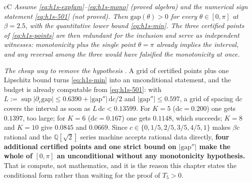 \begin{claimbox}{cC}
\emph{Assume \eqref{eq:h1s-expfam}--\eqref{eq:h1s-mono} (proved algebra) and the numerical sign
statement \eqref{eq:h1s-501} (not proved). Then $\mathrm{gap}(\theta)>0$ for every
$\theta\in[0,\pi]$ at $\beta=2.5$, with the quantitative lower bound \eqref{eq:h1s-min}. The three
certified points of \eqref{eq:h1s-points} are then \emph{redundant for the inclusion} and serve as
independent witnesses: monotonicity plus the single point $\theta=\pi$ already implies the interval,
and any reversal among the three would have falsified the monotonicity at once.} \LC{}
\end{claimbox}


\emph{The cheap way to remove the hypothesis} \LC{}. A grid of certified points plus one Lipschitz
bound turns \eqref{eq:h1s-min} into an unconditional statement, and the budget is already computable
from \eqref{eq:h1s-501}: with $L:=\sup|\partial_{c}\mathrm{gap}|\le0.6390+|\mathrm{gap}''|\,\mathrm{d} c/2$
and $|\mathrm{gap}''|\le0.597$, a grid of spacing $\mathrm{d} c$ covers the interval as soon as
$L\,\mathrm{d} c<0.13599$. For $K=5$ ($\mathrm{d} c=0.200$) one gets $0.1397$, too large; for $K=6$
($\mathrm{d} c=0.167$) one gets $0.1148$, which succeeds; $K=8$ and $K=10$ give $0.0845$ and $0.0669$. Since
$c\in\{0,1/5,2/5,3/5,4/5,1\}$ makes $\beta c$ rational and the $\mathbb{Q}[\sqrt2]$ series machine
accepts rational data directly, \textbf{four additional certified points and one strict bound on
$|\mathrm{gap}''|$ make the whole of $[0,\pi]$ an unconditional \LT{} without any monotonicity
hypothesis.} That is compute, not mathematics, and it is the reason this chapter states the
conditional form rather than waiting for the proof of $T_{5}>0$.

